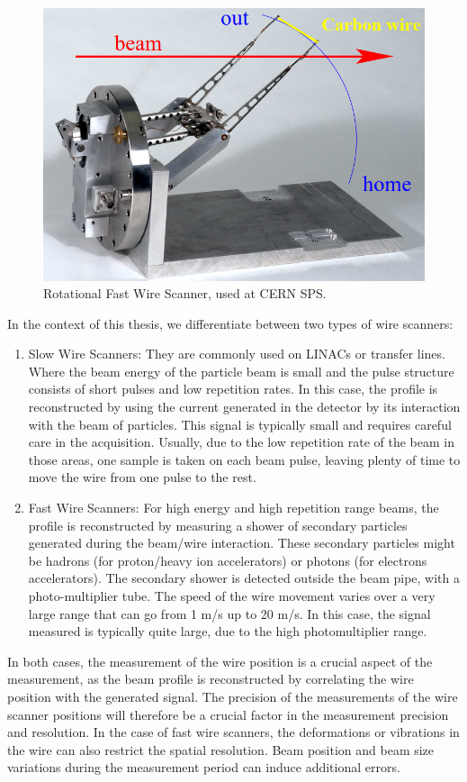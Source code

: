 \begin{figure}[h]
    \centering
    \includegraphics[width=0.6\columnwidth]{WireScanner/WireScanner.png}
    \caption{Rotational Fast Wire Scanner, used at CERN SPS. }
    \label{fig:WireScan}
\end{figure}

In the context of this thesis, we differentiate between two types of wire scanners:

\begin{enumerate}
    \item Slow Wire Scanners: They are commonly used on LINACs or transfer lines. Where the beam energy of the particle beam is small and the pulse structure consists of short pulses and low repetition rates. In this case, the profile is reconstructed by using the current generated in the detector by its interaction with the beam of particles. This signal is typically small and requires careful care in the acquisition. Usually, due to the low repetition rate of the beam in those areas, one sample is taken on each beam pulse, leaving plenty of time to move the wire from one pulse to the rest. 
    \item Fast Wire Scanners: For high energy and high repetition range beams, the profile is reconstructed by measuring a shower of secondary particles generated during the beam/wire interaction. These secondary particles might be hadrons (for proton/heavy ion accelerators) or photons (for electrons accelerators).  The secondary shower is detected outside the beam pipe, with a photo-multiplier tube. The speed of the wire movement varies over a very large range that can go from 1 \si[]{\metre /\second} up to 20 \si[]{\meter /\second}. In this case, the signal measured is typically quite large, due to the high photomultiplier range.  
\end{enumerate}

In both cases, the measurement of the wire position is a crucial aspect of the measurement, as the beam profile is reconstructed by correlating the wire position with the generated signal. The precision of the measurements of the wire scanner positions will therefore be a crucial factor in the measurement precision and resolution. In the case of fast wire scanners, the deformations or vibrations in the wire can also restrict the spatial resolution. Beam position and beam size variations during the measurement period can induce additional errors. 

